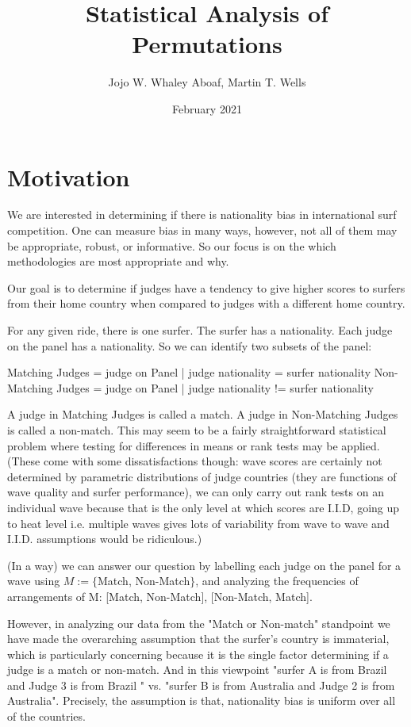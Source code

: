 \documentclass{article}
\title{Statistical Analysis of Permutations}
\author{Jojo W. Whaley Aboaf, Martin T. Wells}
\date{February 2021}
\theoremstyle{definition}
\begin{document}
\maketitle
\tableofcontents
\section{Motivation}
We are interested in determining if there is nationality bias in international surf competition. One can measure bias in many ways, however, not all of them may be appropriate, robust, or informative. So our focus is on the which methodologies are most appropriate and why.


Our goal is to determine if judges have a tendency to give higher scores to surfers from their home country when compared to judges with a different home country.

For any given ride, there is one surfer. The surfer has a nationality. Each judge on the panel has a nationality. So we can identify two subsets of the panel:

Matching Judges = {judge on Panel | judge nationality = surfer nationality }
Non-Matching Judges = {judge on Panel | judge nationality != surfer nationality}

A judge in Matching Judges is called a match. A judge in Non-Matching Judges is called a non-match. This may seem to be a fairly straightforward statistical problem where testing for differences in means or rank tests may be applied. (These come with some dissatisfactions though: wave scores are certainly not determined by parametric distributions of judge countries (they are functions of wave quality and surfer performance), we can only carry out rank tests on an individual wave because that is the only level at which scores are I.I.D, going up to heat level i.e. multiple waves gives lots of variability from wave to wave and I.I.D. assumptions would be ridiculous.)

(In a way) we can answer our question by labelling each judge on the panel for a wave using $M :=\{$Match, Non-Match$\}$, and analyzing the frequencies of arrangements of M: [Match, Non-Match], [Non-Match, Match].

However, in analyzing our data from the "Match or Non-match" standpoint we have made the overarching assumption that the  surfer's country is immaterial, which is particularly concerning because it is the single factor determining if a judge is a match or non-match. And in this viewpoint "surfer A is from Brazil and Judge 3 is from Brazil " vs. "surfer B is from Australia and Judge 2 is from Australia". Precisely, the assumption is that, nationality bias is uniform over all of the countries. 
\end{document}

